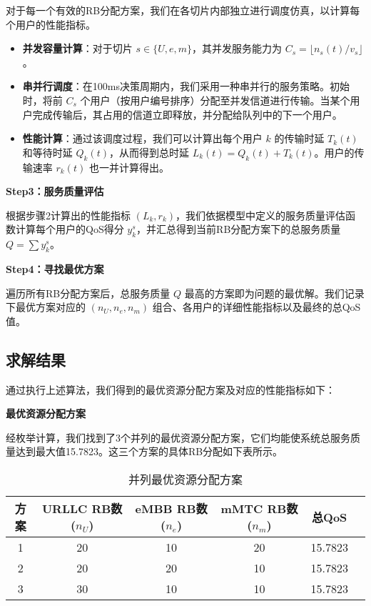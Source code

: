 对于每一个有效的RB分配方案，我们在各切片内部独立进行调度仿真，以计算每个用户的性能指标。
\begin{itemize}
    \item \textbf{并发容量计算}：对于切片 $s \in \{U, e, m\}$，其并发服务能力为 $C_s = \lfloor n_s(t) / v_s \rfloor$。
    \item \textbf{串并行调度}：在100ms决策周期内，我们采用一种串并行的服务策略。初始时，将前 $C_s$ 个用户（按用户编号排序）分配至并发信道进行传输。当某个用户完成传输后，其占用的信道立即释放，并分配给队列中的下一个用户。
    \item \textbf{性能计算}：通过该调度过程，我们可以计算出每个用户 $k$ 的传输时延 $T_k(t)$ 和等待时延 $Q_k(t)$，从而得到总时延 $L_k(t) = Q_k(t) + T_k(t)$。用户的传输速率 $r_k(t)$ 也一并计算得出。
\end{itemize}

\textbf{Step3：服务质量评估}

根据步骤2计算出的性能指标 $(L_k, r_k)$，我们依据模型中定义的服务质量评估函数计算每个用户的QoS得分 $y_k^s$，并汇总得到当前RB分配方案下的总服务质量 $Q = \sum y_k^s$。

\textbf{Step4：寻找最优方案}

遍历所有RB分配方案后，总服务质量 $Q$ 最高的方案即为问题的最优解。我们记录下最优方案对应的 $(n_U, n_e, n_m)$ 组合、各用户的详细性能指标以及最终的总QoS值。

\subsection{求解结果}
通过执行上述算法，我们得到的最优资源分配方案及对应的性能指标如下：

\textbf{最优资源分配方案}

经枚举计算，我们找到了3个并列的最优资源分配方案，它们均能使系统总服务质量达到最大值15.7823。这三个方案的具体RB分配如下表所示。

\begin{table}[H]
\centering
\caption{并列最优资源分配方案}
\label{tab:q1_best_solutions}
\begin{tabular}{cccccc}
\hline
\textbf{方案} & \textbf{URLLC RB数 ($n_U$)} & \textbf{eMBB RB数 ($n_e$)} & \textbf{mMTC RB数 ($n_m$)} & \textbf{总QoS} \\
\hline
1 & 20 & 10 & 20 & 15.7823 \\
2 & 20 & 20 & 10 & 15.7823 \\
3 & 30 & 10 & 10 & 15.7823 \\
\hline
\end{tabular}
\end{table}

